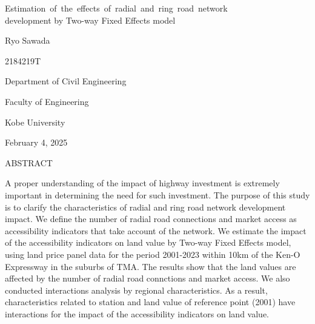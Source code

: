 \newpage

\begin{center}

{\LARGE 
\textsf{
\mbox{Estimation of the effects of radial and ring road network  }\\
\vspace{0.3cm}
development by Two-way Fixed Effects model }}



\vspace{12mm}
Ryo Sawada

\vspace{0.5mm}
2184219T

\vspace{0.5mm}
Department of Civil Engineering
 
Faculty of Engineering

Kobe University
 
 \vspace{5mm}

February 4, 2025

\vspace{15mm}
\textsf{ABSTRACT}
\end{center}
 \vspace{6mm}
 
A proper understanding of the impact of highway investment is extremely important in determining the need for such investment. The purpose of this study is to clarify the characteristics of radial and ring road network development impact. We define the number of radial road connections and market access as accessibility indicators that take account of the network. We estimate the impact of the accessibility indicators on land value by Two-way Fixed Effects model, using land price panel data for the period  2001-2023 within 10km of the Ken-O Expressway in the suburbs of TMA. The results show that the land values are affected by the number of radial road connctions and market access. We also conducted interactions analysis by regional characteristics. As a result, characteristics related to station and land value of reference point (2001) have interactions for the impact of the accessibility indicators on land value.